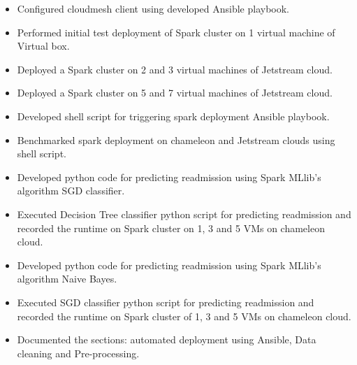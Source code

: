\documentclass[9pt,twocolumn,twoside]{styles/osajnl}
\begin{document}
\begin{appendices}
\begin{itemize}
\begin{itemize}
\item Configured cloudmesh client using developed Ansible playbook.
\item Performed initial test deployment of Spark cluster on 1 virtual machine of Virtual box.
\item Deployed a Spark cluster on 2 and 3 virtual machines of Jetstream cloud.
\item Deployed a Spark cluster  on 5 and 7 virtual machines of Jetstream cloud.
\item Developed shell script for triggering spark deployment Ansible playbook. 
\item Benchmarked spark deployment on chameleon and Jetstream clouds using shell script.
\item Developed python code for predicting readmission using Spark MLlib's algorithm SGD classifier.
\item Executed Decision Tree classifier python script for predicting readmission and recorded the runtime on Spark cluster on 1, 3 and 5 VMs on chameleon cloud.
\item Developed python code for predicting readmission using Spark MLlib's algorithm Naive Bayes.
\item Executed SGD classifier python script for predicting readmission and recorded the runtime on Spark cluster of 1, 3 and 5 VMs  on chameleon cloud.
\item Documented the sections: automated deployment using Ansible, Data cleaning and Pre-processing. 
    \end{itemize}
\end{itemize}
\end{appendices}
\end{document}

